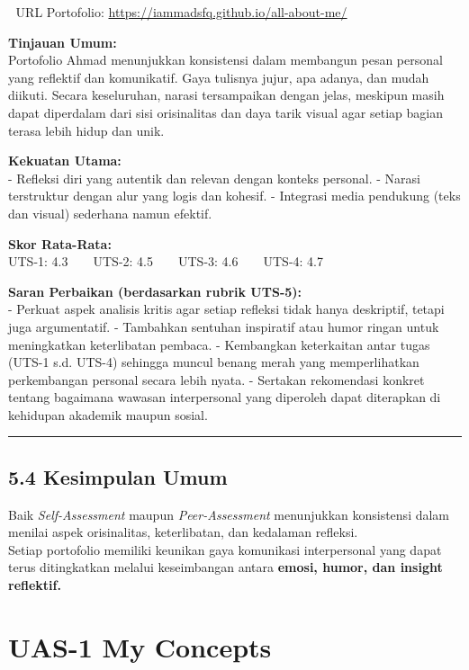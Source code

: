 \documentclass[
  letterpaper,
  DIV=11,
  numbers=noendperiod]{scrreprt}
\begin{document}
🔗 URL Portofolio: \url{https://iammadsfq.github.io/all-about-me/}

\textbf{Tinjauan Umum:}\\
Portofolio Ahmad menunjukkan konsistensi dalam membangun pesan personal
yang reflektif dan komunikatif. Gaya tulisnya jujur, apa adanya, dan
mudah diikuti. Secara keseluruhan, narasi tersampaikan dengan jelas,
meskipun masih dapat diperdalam dari sisi orisinalitas dan daya tarik
visual agar setiap bagian terasa lebih hidup dan unik.

\textbf{Kekuatan Utama:}\\
- Refleksi diri yang autentik dan relevan dengan konteks personal. -
Narasi terstruktur dengan alur yang logis dan kohesif. - Integrasi media
pendukung (teks dan visual) sederhana namun efektif.

\textbf{Skor Rata-Rata:}\\
UTS-1: 4.3 \textbar{} UTS-2: 4.5 \textbar{} UTS-3: 4.6 \textbar{} UTS-4:
4.7

\textbf{Saran Perbaikan (berdasarkan rubrik UTS-5):}\\
- Perkuat aspek analisis kritis agar setiap refleksi tidak hanya
deskriptif, tetapi juga argumentatif. - Tambahkan sentuhan inspiratif
atau humor ringan untuk meningkatkan keterlibatan pembaca. - Kembangkan
keterkaitan antar tugas (UTS-1 s.d. UTS-4) sehingga muncul benang merah
yang memperlihatkan perkembangan personal secara lebih nyata. - Sertakan
rekomendasi konkret tentang bagaimana wawasan interpersonal yang
diperoleh dapat diterapkan di kehidupan akademik maupun sosial.

\begin{center}\rule{0.5\linewidth}{0.5pt}\end{center}

\section{5.4 Kesimpulan Umum}\label{kesimpulan-umum}

Baik \emph{Self-Assessment} maupun \emph{Peer-Assessment} menunjukkan
konsistensi dalam menilai aspek orisinalitas, keterlibatan, dan
kedalaman refleksi.\\
Setiap portofolio memiliki keunikan gaya komunikasi interpersonal yang
dapat terus ditingkatkan melalui keseimbangan antara \textbf{emosi,
humor, dan insight reflektif.}


\chapter{UAS-1 My Concepts}\label{uas-1-my-concepts}
\end{document}
